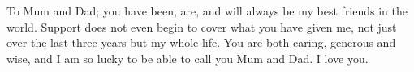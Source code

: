 %

\bigskip

\noindent To Mum and Dad;  you have been, are, and will always be my best friends in the world.  Support does not even begin to cover what you have given me, not just over the last three years but my whole life.  You are both caring, generous and wise, and I am so lucky to be able to call you Mum and Dad.  I love you.   




%
%

